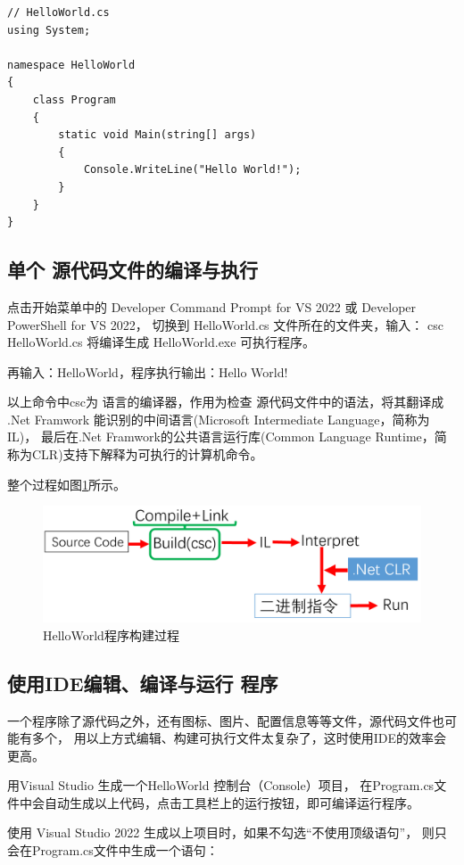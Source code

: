 \begin{lstlisting}
// HelloWorld.cs
using System;

namespace HelloWorld
{
	class Program
	{
		static void Main(string[] args) 
		{
			Console.WriteLine("Hello World!");
		}
	}
}
\end{lstlisting}

\subsection{单个 \cs  源代码文件的编译与执行}
点击开始菜单中的 Developer Command Prompt for VS 2022 或 Developer PowerShell for VS 2022，
切换到 HelloWorld.cs 文件所在的文件夹，输入： csc HelloWorld.cs 将编译生成 HelloWorld.exe 
可执行程序。

再输入：HelloWorld，程序执行输出：Hello World!

以上命令中csc为 \cs 语言的编译器，作用为检查 \cs 源代码文件中的语法，将其翻译成 .Net Framwork 
能识别的中间语言(Microsoft Intermediate Language，简称为IL)，
最后在.Net Framwork的公共语言运行库(Common Language Runtime，简称为CLR)支持下解释为可执行的计算机命令。

整个过程如图\ref{fig:BuildHelloWorld}所示。
\begin{figure}[htbp]
	\centering
	\includegraphics[scale=0.8]{chapter/csenv/BuildHelloWorld.png}
	\caption{HelloWorld程序构建过程}
	\label{fig:BuildHelloWorld}
\end{figure}

\subsection{使用IDE编辑、编译与运行 \cs 程序}
一个程序除了源代码之外，还有图标、图片、配置信息等等文件，源代码文件也可能有多个，
用以上方式编辑、构建可执行文件太复杂了，这时使用IDE的效率会更高。

用Visual Studio 生成一个HelloWorld 控制台（Console）项目，
在Program.cs文件中会自动生成以上代码，点击工具栏上的运行按钮，即可编译运行程序。

使用 Visual Studio 2022 生成以上项目时，如果不勾选``不使用顶级语句''，
则只会在Program.cs文件中生成一个语句：

